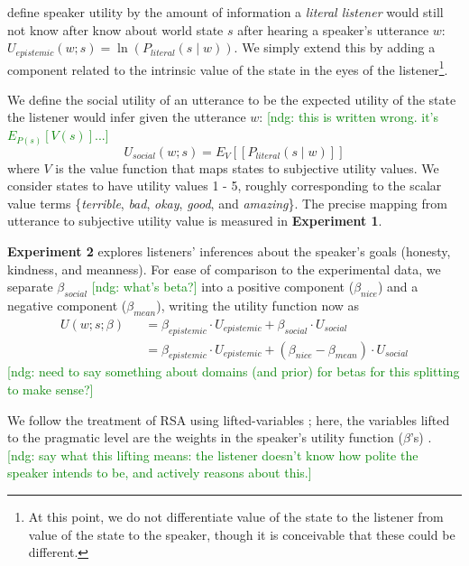 \documentclass[10pt,letterpaper]{article}
\newcommand{\denote}[1]{\mbox{ $[\![ #1 ]\!]$}}
\newcommand{\ndg}[1]{\textcolor{Green}{[ndg: #1]}}
\begin{document}
 define speaker utility by the amount of information a \emph{literal listener} would still not know after know about world state $s$ after hearing a speaker's utterance $w$: 
$U_{epistemic}(w; s) = \ln(P_{literal}(s \mid w)) $.
We simply extend this by adding a component related to the intrinsic value of the state in the eyes of the listener\footnote{At this point, we do not differentiate value of the state to the listener from value of the state to the speaker, though it is conceivable that these could be different.}.

We define the social utility of an utterance to be the expected utility of the state the listener would infer given the utterance $w$: 
\ndg{this is written wrong. it's $E_{P(s)}[V(s)]$...}
%
$$
U_{social}(w; s) = E_{V}[[P_{literal}(s \mid w)]]
$$
%
where $V$ is the value function that maps states to subjective utility values. 
We consider states to have utility values 1 - 5, roughly corresponding to the scalar value terms \{\emph{terrible}, \emph{bad}, \emph{okay}, \emph{good}, and \emph{amazing}\}.
The precise mapping from utterance to subjective utility value is measured in \textbf{Experiment 1}.





\textbf{Experiment 2} explores listeners' inferences about the speaker's goals (honesty, kindness, and meanness).
For ease of comparison to the experimental data, we separate $\beta_{social}$ \ndg{what's beta?} into a positive component ($\beta_{nice}$) and a negative component ($\beta_{mean}$), writing the utility function now as
\begin{eqnarray*}
U(w;s; \beta) && = \beta_{epistemic}\cdot U_{epistemic} + \beta_{social} \cdot U_{social} \\
&&= \beta_{epistemic}\cdot U_{epistemic} + (\beta_{nice} - \beta_{mean}) \cdot U_{social}
\end{eqnarray*}
\ndg{need to say something about domains (and prior) for betas for this splitting to make sense?}


%
%
We follow the treatment of RSA using lifted-variables \cite{GoodmanLassiter2015, Kao2014, Degen2015}; here, the variables lifted to the pragmatic level are the weights in the speaker's utility function ($\beta$'s) .
\ndg{say what this lifting means: the listener doesn't know how polite the speaker intends to be, and actively reasons about this.}
\end{document}
